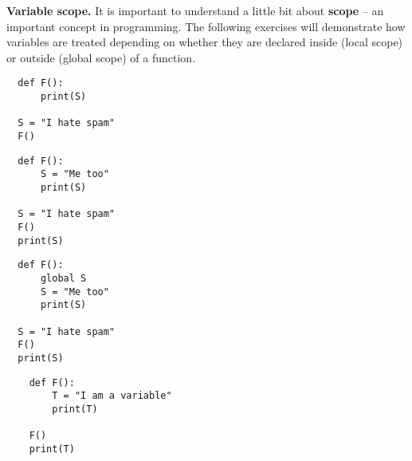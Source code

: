 \documentclass[11pt]{report}
\begin{document}
\begin{Exercise}[title=Variable scope]

\textbf{Variable scope.} It is important to understand a little bit about \textbf{scope} -- an important concept in programming. The following exercises will demonstrate how variables are treated depending on whether they are declared inside (local scope) or outside (global scope) of a function.

\begin{verbatim}
  def F():
      print(S)
    
  S = "I hate spam"
  F()
\end{verbatim}

\begin{verbatim}
  def F():
      S = "Me too"
      print(S)
  
  S = "I hate spam"
  F()
  print(S)
\end{verbatim}

\begin{verbatim}
  def F():
      global S
      S = "Me too"
      print(S)

  S = "I hate spam"
  F()
  print(S)
\end{verbatim}



  \begin{verbatim}
    def F():
        T = "I am a variable"
        print(T)
    
    F()
    print(T)
\end{verbatim}

		
\end{Exercise}
\end{document}
